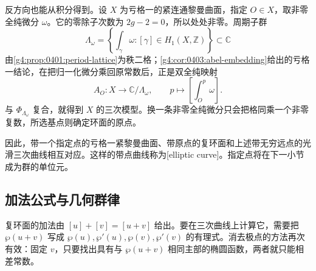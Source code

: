 反方向也能从积分得到。设 \(X\) 为亏格一的紧连通黎曼曲面，指定 \(O\in X\)，取非零全纯微分 \(\omega\)。它的零除子次数为 \(2g-2=0\)，所以处处非零。周期子群
\[
	\Lambda_\omega=\left\{\int_\gamma\omega:
		[\gamma]\in H_1(X,\mathbb Z)\right\}\subset\mathbb C
\]
由\cref{g4:prop:0401:period-lattice}为秩二格；\cref{g4:cor:0403:abel-embedding}给出的亏格一结论，在把归一化微分乘回原常数后，正是双全纯映射
\[
	A_O:X\longrightarrow\mathbb C/\Lambda_\omega,\qquad
	p\longmapsto\left[\int_O^p\omega\right].
\]
与 \(\Phi_{\Lambda_\omega}\) 复合，就得到 \(X\) 的三次模型。换一条非零全纯微分只会把格同乘一个非零复数，所选基点则确定环面的原点。

\ProseParagraphBreak

因此，带一个指定点的亏格一紧黎曼曲面、带原点的复环面和上述带无穷远点的光滑三次曲线相互对应。这样的带点曲线称为[elliptic curve]。指定点将在下一小节成为群的单位元。

\subsection{加法公式与几何群律}
\label{g4:subsec:0405:03}

复环面的加法由 \([u]+[v]=[u+v]\) 给出。要在三次曲线上计算它，需要把 \(\wp(u+v)\) 写成 \(\wp(u),\wp'(u),\wp(v),\wp'(v)\) 的有理式。消去极点的方法再次有效：固定 \(v\)，只要找出具有与 \(\wp(u+v)\) 相同主部的椭圆函数，两者就只能相差常数。


